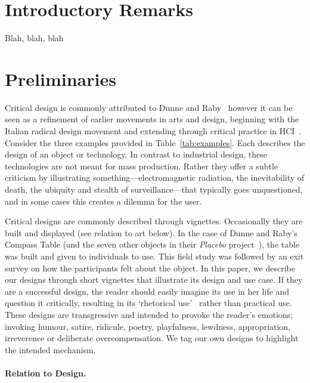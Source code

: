 
\section{Introductory Remarks}

Blah, blah, blah

\section{Preliminaries}



Critical design is commonly attributed to Dunne and Raby~\cite{DuRa01,Dun05} however it can be seen as a refinement of earlier movements in arts and design, beginning with the Italian radical design movement and extending through critical practice in HCI~\cite{Mal17}. Consider the three examples provided in Table~\ref{tab:examples}. Each describes the design of an object or technology. In contrast to industrial design, these technologies are not meant for mass production. Rather they offer a subtle criticism by illustrating something---electromagnetic radiation, the inevitability of death, the ubiquity and stealth of surveillance---that typically goes unquestioned, and in some cases this creates a dilemma for the user.

Critical designs are commonly described through vignettes. Occasionally they are built and displayed (see relation to art below). In the case of Dunne and Raby's Compass Table (and the seven other objects in their \textit{Placebo} project~\cite{DuRa01}), the table was built and given to individuals to use. This field study was followed by an exit survey on how the participants felt about the object. In this paper, we describe our designs through short vignettes that illustrate its design and use case. If they are a successful design, the reader should easily imagine its use in her life and question it critically, resulting in its `rhetorical use'~\cite{Mal17} rather than practical use. These designs are transgressive and intended to provoke the reader's emotions; invoking humour, satire, ridicule, poetry, playfulness, lewdness, appropriation, irreverence or deliberate overcompensation. We tag our own designs to highlight the intended mechanism.

\paragraph{Relation to Design.}

